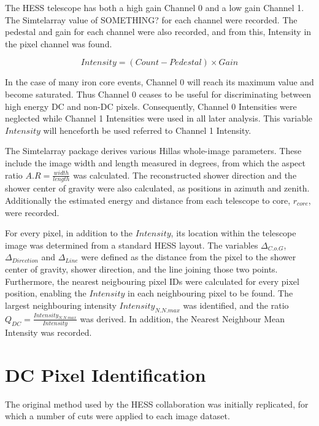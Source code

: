 \documentclass[]{article}
\begin{document}
The HESS telescope has both a high gain Channel 0 and a low gain Channel 1. The Sim\textunderscore telarray value of SOMETHING? for each channel were recorded. The pedestal and gain for each channel were also recorded, and from this, Intensity in the pixel channel was found.

\[ Intensity = (Count - Pedestal)\times Gain \]

In the case of many iron core events, Channel 0 will reach its maximum value and become saturated. Thus Channel 0 ceases to be useful for discriminating between high energy DC and non-DC pixels. Consequently, Channel 0 Intensities were neglected while Channel 1 Intensities were used in all later analysis. This variable $Intensity$ will henceforth be used referred to Channel 1 Intensity.

The Sim\textunderscore telarray package derives various Hillas whole-image parameters. These include the image width and length measured in degrees, from which the aspect ratio $A.R = \frac{width}{length}$ was calculated. The reconstructed shower direction and the shower center of gravity were also calculated, as positions in azimuth and zenith. Additionally the estimated energy and distance from each telescope to core, $r_{core}$,  were recorded.

For every pixel, in addition to the $Intensity$, its location within the telescope image was determined from a standard HESS layout. The variables $ \Delta_{C.o.G}$, $\Delta_{Direction}$ and $\Delta_{Line}$ were defined as the distance from the pixel to the shower center of gravity, shower direction, and the line joining those two points. Furthermore, the nearest neigbouring pixel IDs were calculated for every pixel position, enabling the $Intensity$ in each neighbouring pixel to be found. The largest neighbouring intensity $Intensity_{N.N.max}$ was identified, and the ratio $ Q_{DC} = \frac{Intensity_{N.N.max}}{Intensity} $ was derived. In addition, the Nearest Neighbour Mean Intensity was recorded. 

\section{DC Pixel Identification}  
The original method used by the HESS collaboration \cite{hess07} was initially replicated, for which a number of cuts were applied to each image dataset.
\end{document}
